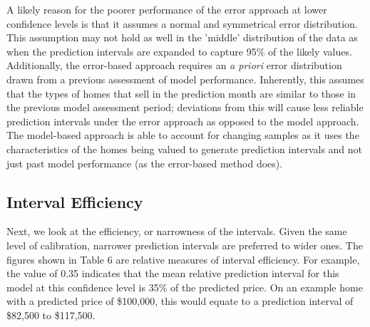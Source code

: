 \documentclass[colTwo]{anon}
\theoremstyle{definition}
\begin{document}
A likely reason for the poorer performance of the error approach at lower confidence levels is that it assumes a normal and symmetrical error distribution. This assumption may not hold as well in the 'middle' distribution of the data as when the prediction intervals are expanded to capture 95\% of the likely values. Additionally, the error-based approach requires an \textit{a priori} error distribution drawn from a previous assessment of model performance.  Inherently, this assumes that the types of homes that sell in the prediction month are similar to those in the previous model assessment period; deviations from this will cause less reliable prediction intervals under the error approach as opposed to the model approach.  The model-based approach is able to account for changing samples as it uses the characteristics of the homes being valued to generate prediction intervals and not just past model performance (as the error-based method does). 
\subsection{Interval Efficiency}

Next, we look at the efficiency, or narrowness of the intervals.  Given the same level of calibration, narrower prediction intervals are preferred to wider ones. The figures shown in Table 6 are relative measures of interval efficiency.  For example, the value of 0.35 indicates that the mean relative prediction interval for this model at this confidence level is 35\% of the predicted price. On an example home with a predicted price of \$100,000, this would equate to a prediction interval of \$82,500 to \$117,500.
\end{document}
